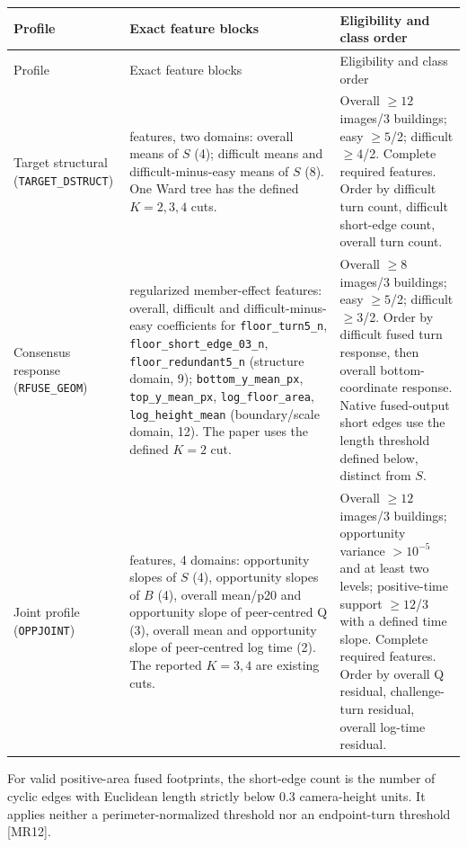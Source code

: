 \begingroup\small
\begin{longtable}{>{\raggedright\arraybackslash}p{.19\linewidth}>{\raggedright\arraybackslash}p{.49\linewidth}>{\raggedright\arraybackslash}p{.23\linewidth}}
\toprule
Profile & Exact feature blocks & Eligibility and class order \\
\midrule\endfirsthead
\toprule Profile & Exact feature blocks & Eligibility and class order \\
\midrule\endhead
Target structural
(\texttt{TARGET\_DSTRUCT})
&
12 features, two domains: overall means of $S$ (4); difficult means and
difficult-minus-easy means of $S$ (8).
One Ward tree has the defined $K=2,3,4$ cuts.
&
Overall $\geq12$ images/3 buildings; easy $\geq5$/2; difficult $\geq4$/2.
Complete required features.
Order by difficult turn count, difficult short-edge count, overall turn count.
\\[3pt]
Consensus response
(\texttt{RFUSE\_GEOM})
&
21 regularized member-effect features: overall, difficult and
difficult-minus-easy coefficients for
\texttt{floor\_turn5\_n},
\texttt{floor\_short\_edge\_03\_n},
\texttt{floor\_redundant5\_n} (structure domain, 9);
\texttt{bottom\_y\_mean\_px}, \texttt{top\_y\_mean\_px},
\texttt{log\_floor\_area}, \texttt{log\_height\_mean}
(boundary/scale domain, 12).
The paper uses the defined $K=2$ cut.
&
Overall $\geq8$ images/3 buildings; easy $\geq5$/2; difficult $\geq3$/2.
Order by difficult fused turn response, then overall bottom-coordinate response.
Native fused-output short edges use the length threshold defined below,
distinct from $S$.
\\[3pt]
Joint profile
(\texttt{OPPJOINT})
&
13 features, 4 domains: opportunity slopes of $S$ (4), opportunity slopes
of $B$ (4), overall mean/p20 and opportunity slope of peer-centred Q (3),
overall mean and opportunity slope of peer-centred log time (2).
The reported $K=3,4$ are existing cuts.
&
Overall $\geq12$ images/3 buildings; opportunity variance $>10^{-5}$ and
at least two levels; positive-time support $\geq12$/3 with a defined time slope.
Complete required features.
Order by overall Q residual, challenge-turn residual, overall log-time residual.
\\
\bottomrule
\end{longtable}
\endgroup

For valid positive-area fused footprints, the short-edge count is the number
of cyclic edges with Euclidean length strictly below 0.3 camera-height units.
It applies neither a perimeter-normalized threshold nor an endpoint-turn
threshold [MR12].

